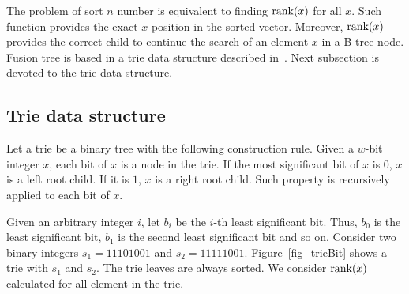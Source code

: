 \documentclass[11pt]{article}
\newcommand{\rk}[1]{\mbox{\rm{rank}}(#1)}
\begin{document}
The problem of sort $n$ number is equivalent to finding $\rk{x}$ for all $x$. Such function provides the exact $x$ position in the sorted vector. Moreover, $\rk{x}$ provides the correct child to continue the search of an element $x$ in a B-tree node. Fusion tree is based in a trie data structure described in~\cite{ajtai}. Next subsection is devoted to the trie data structure.




\subsection{Trie data structure~\cite{ajtai}}



Let a trie be a binary tree with the following construction rule. Given a $w$-bit integer $x$, each bit of $x$ is a node in the trie. If the most significant bit of $x$ is $0$, $x$ is a left root child. If it is $1$, $x$ is a right root child. Such property is recursively applied to each bit of $x$.



Given an arbitrary integer $i$, let $b_i$ be the $i$-th least significant bit. Thus, $b_0$ is the least significant bit, $b_1$ is the second least significant bit and so on. Consider two binary integers $s_1 = 11101001$ and $s_2 = 11111001$. 
Figure~\ref{fig_trieBit} shows a trie with $s_1$ and $s_2$. The trie leaves are always sorted. We consider $\rk{x}$ calculated for all element in the trie.
\end{document}
